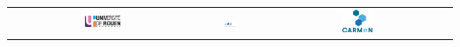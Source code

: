 {\begin{titlingpage}
\begin{center}
{    } %

    \vfill %
    \begin{tabular}{ccc}
      \includegraphics[width=0.20\textwidth]{img/logoUni} & \hspace{0.15\textwidth}
      \includegraphics[width=0.20\textwidth]{img/logoED} & \hspace{0.15\textwidth}
      \includegraphics[width=0.17\textwidth]{img/logoCarmen}
    \end{tabular}

  \end{center}

\end{titlingpage} %

\normalfont %
}


